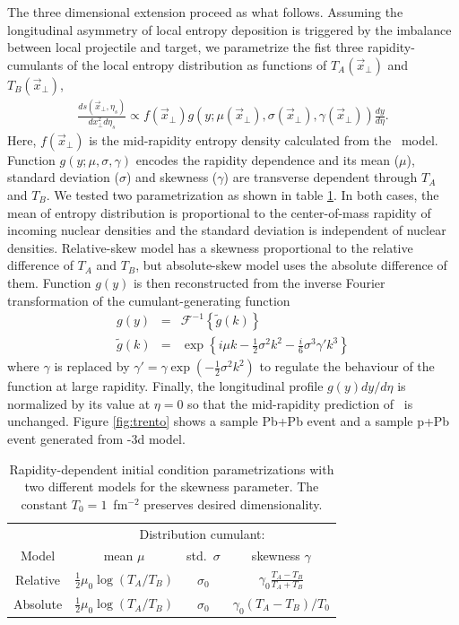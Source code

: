 \documentclass[3p,times,twocolumn]{elsarticle}
\begin{document}
The three dimensional extension proceed as what follows. 
Assuming the longitudinal asymmetry of local entropy deposition is triggered by the imbalance between local projectile and target, we parametrize the fist three rapidity-cumulants of the local entropy distribution as functions of $T_A(\vec{x}_{\perp})$ and $T_B(\vec{x}_{\perp})$,
\begin{eqnarray}
\frac{ds(\vec{x}_{\perp}, \eta_s)}{dx_{\perp}^2 d\eta_s} \propto f(\vec{x}_{\perp})g(y; \mu(\vec{x}_{\perp}), \sigma(\vec{x}_{\perp}), \gamma(\vec{x}_{\perp}))\frac{dy}{d\eta}.
\end{eqnarray}
Here, $f(\vec{x}_{\perp})$ is the  mid-rapidity entropy density calculated from the \trento~model. Function $g(y; \mu, \sigma, \gamma)$ encodes the rapidity dependence and its mean ($\mu$), standard deviation ($\sigma$) and skewness ($\gamma$) are transverse dependent through $T_A$ and $T_B$.
We tested two parametrization as shown in table \ref{tab:parametrization}.
In both cases, the mean of entropy distribution is proportional to the center-of-mass rapidity of incoming nuclear densities and the standard deviation is independent of nuclear densities. 
Relative-skew model has a skewness proportional to the relative difference of $T_A$ and $T_B$, but absolute-skew model uses the absolute difference of them.
Function $g(y)$ is then reconstructed from the inverse Fourier transformation of the cumulant-generating function
\begin{eqnarray}
g(y) &=& \mathcal{F}^{-1}\left\lbrace\tilde{g}(k)\right\rbrace \\
\tilde{g}(k) &=& \exp \left\lbrace i\mu k - \frac{1}{2}\sigma^2 k^2 - \frac{i}{6}\sigma^3 \gamma'k^3\right\rbrace
\end{eqnarray}
where $\gamma$ is replaced by $\gamma' = \gamma\exp(-\frac{1}{2}\sigma^2k^2)$ to regulate the behaviour of the function at large rapidity.
Finally, the longitudinal profile $g(y)dy/d\eta$ is normalized by its value at $\eta=0$ so that the mid-rapidity prediction of \trento~is unchanged.
Figure \ref{fig:trento} shows a sample Pb+Pb event and a sample p+Pb event generated from \trento-3d model.

\begin{table}
  \caption{
    \label{tab:parametrization}
    Rapidity-dependent initial condition parametrizations with two different models for the skewness parameter. The constant $T_0 = 1$~fm$^{-2}$ preserves desired dimensionality.
  }
  \begin{tabular}{cccc}
\hline\hline
      & \multicolumn{3}{c}{Distribution cumulant:} \\
      Model & \multicolumn{1}{c}{mean $\mu$} & \multicolumn{1}{c}{std.\ $\sigma$} & \multicolumn{1}{c}{skewness $\gamma$} \\
\hline
        Relative  & $\frac{1}{2} \mu_0 \log(T_A/T_B)$ & $\sigma_0$ & $\gamma_0 \frac{T_A - T_B}{T_A + T_B}$ \smallskip \\
        Absolute & $\frac{1}{2} \mu_0 \log(T_A/T_B)$  & $\sigma_0$ & $\gamma_0 (T_A - T_B)/T_0$ \\
\hline\hline
  \end{tabular}
\end{table}
\end{document}

